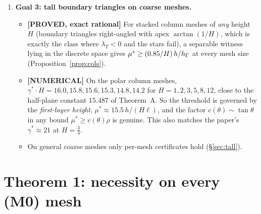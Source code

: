 \documentclass[11pt]{article}
\theoremstyle{remark}\newtheorem{remark}[theorem]{Remark}
\newcommand{\lab}[1]{\textbf{[#1]}}
\begin{document}
\begin{enumerate}[label=(\arabic*)]
\begin{itemize}
  \item The global threshold is $\gamma^\ast=\mu^\ast\hG/h=3.056$ ($N=128$) and $3.128$ ($N=256$). It is identical to 4
    digits for $L=2.5,5,10$, while $\rho$ runs over $21.6$--$416$. So $\mu^\ast=\gamma^\ast\rho$ exactly scales like $\rho$:
    the counterexample is local, not global.
  \item $H=8$ gives the same picture: no witness on 1--3 stars, and $\gamma^\ast=1.853$ for every $L$.
  \end{itemize}
  Theorem~\ref{thm:main} proves the scaling for this family as $h\to0$.
\item \textbf{Goal 3: tall boundary triangles on coarse meshes.}
  \begin{itemize}
  \item \lab{PROVED, exact rational} For stacked column meshes of \emph{any} height $H$ (boundary triangles right-angled
    with apex $\arctan(1/H)$, which is exactly the class where $\lambda_T<0$ and the stars fail), a separable witness lying
    in the discrete space gives $\mu^\ast\ge(0.85/H)\,h/h_\Gamma$ at every mesh size (Proposition~\ref{prop:cols}).
  \item \lab{NUMERICAL} On the polar column meshes, $\gamma^\ast\cdot H=16.0,15.8,15.6,15.3,14.8,14.2$ for
    $H=1,2,3,5,8,12$, close to the half-plane constant $15.487$ of Theorem~A. So the threshold is governed by the
    \emph{first-layer height}, $\mu^\ast\approx15.5\,h/(H\ell)$, and the factor $c(\theta)\sim\tan\theta$ in any bound
    $\mu^\ast\ge c(\theta)\rho$ is genuine. This also matches the paper's $\gamma^\ast\approx21$ at $H=\frac34$.
  \item On general coarse meshes only per-mesh certificates hold (\S\ref{sec:tall}).
  \end{itemize}
\end{enumerate}

\section{Theorem 1: necessity on every (M0) mesh}\label{sec:main}
\end{document}

